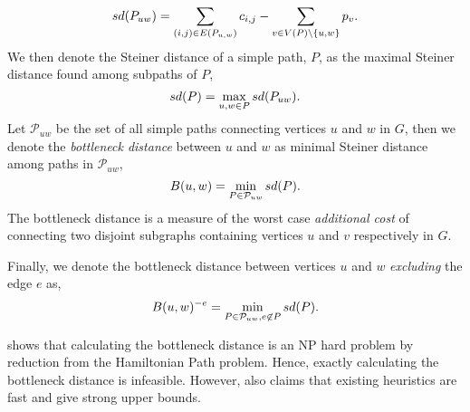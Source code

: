  $$sd(P_{uw}) = \sum_{(i,j) \in E(P_{u,w})} c_{i,j} -
 \sum_{v \in V(P) \setminus \{u,w\}} p_{v}\mathnormal{.}$$
 We then denote the Steiner distance of a simple path, $P$, as the maximal Steiner
 distance found among subpaths of $P$,
 $$sd(P) = \max_{u,w \in P} sd(P_{uw})\mathnormal{.}$$
 Let $\mathcal{P}_{uw}$ be the set of all simple paths
 connecting vertices $u$ and $w$ in
 $G$, then we denote the \textit{bottleneck distance} between $u$ and $w$ as minimal Steiner
  distance among paths in $\mathcal{P}_{uw}$,
  $$B(u,w) = \min_{P \in  \mathcal{P}_{uw}} sd(P)\mathnormal{.}$$
  The bottleneck distance is a measure of the worst case \textit{additional cost}
 of connecting
 two disjoint subgraphs containing vertices $u$ and $v$ respectively in $G$.


  Finally, we denote the bottleneck distance between vertices $u$ and $w$ \textit{excluding}
  the edge $e$ as,
  $$B(u,w)^{-e} = \min_{P \in  \mathcal{P}_{uw}, e \not \in P} sd(P)\mathnormal{.}$$


 \cite{uchoa2006reduction} shows that calculating the bottleneck distance
 is an NP hard problem by reduction from the Hamiltonian Path problem. Hence,
 exactly calculating the bottleneck distance is infeasible. However, \cite{uchoa2006reduction}
 also claims that existing heuristics are fast and give strong upper bounds.

